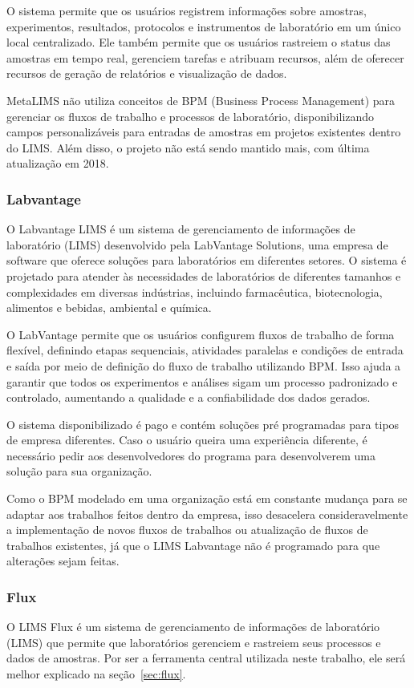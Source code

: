 O sistema permite que os usuários registrem informações sobre amostras, experimentos, resultados, protocolos e instrumentos de laboratório em um único local centralizado. Ele também permite que os usuários rastreiem o status das amostras em tempo real, gerenciem tarefas e atribuam recursos, além de oferecer recursos de geração de relatórios e visualização de dados.

MetaLIMS não utiliza conceitos de BPM (Business Process Management) para gerenciar os fluxos de trabalho e processos de laboratório, disponibilizando campos personalizáveis para entradas de amostras em projetos existentes dentro do LIMS.
Além disso, o projeto não está sendo mantido mais, com última atualização em 2018.

\subsubsection{Labvantage}

O Labvantage LIMS é um sistema de gerenciamento de informações de laboratório (LIMS) desenvolvido pela LabVantage Solutions, uma empresa de software que oferece soluções para laboratórios em diferentes setores. O sistema é projetado para atender às necessidades de laboratórios de diferentes tamanhos e complexidades em diversas indústrias, incluindo farmacêutica, biotecnologia, alimentos e bebidas, ambiental e química.

O LabVantage permite que os usuários configurem fluxos de trabalho de forma flexível, definindo etapas sequenciais, atividades paralelas e condições de entrada e saída por meio de definição do fluxo de trabalho utilizando BPM. Isso ajuda a garantir que todos os experimentos e análises sigam um processo padronizado e controlado, aumentando a qualidade e a confiabilidade dos dados gerados.

O sistema disponibilizado é pago e contém soluções pré programadas para tipos de empresa diferentes. Caso o usuário queira uma experiência diferente, é necessário pedir aos desenvolvedores do programa para desenvolverem uma solução para sua organização.

Como o BPM modelado em uma organização está em constante mudança para se adaptar aos trabalhos feitos dentro da empresa, isso desacelera consideravelmente a implementação de novos fluxos de trabalhos ou atualização de fluxos de trabalhos existentes, já que o LIMS Labvantage não é programado para que alterações sejam feitas.

\subsubsection{Flux}

O LIMS Flux é um sistema de gerenciamento de informações de laboratório (LIMS) que permite que laboratórios gerenciem e rastreiem seus processos e dados de amostras. Por ser a ferramenta central utilizada neste trabalho, ele será melhor explicado na seção~\ref{sec:flux}.



